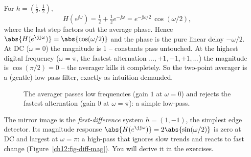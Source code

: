 \begin{example}
\label{ch12:freq-averager}
For $h=(\tfrac12,\tfrac12)$,
\[
  H(e^{\jj\omega}) = \tfrac12 + \tfrac12 e^{-\jj\omega}
  = e^{-\jj\omega/2}\,\cos(\omega/2),
\]
where the last step factors out the average phase. Hence
$\abs{H(e^{\jj\omega})}=\abs{\cos(\omega/2)}$ and the phase is the pure linear
delay $-\omega/2$. At DC ($\omega=0$) the magnitude is $1$ -- constants pass
untouched. At the highest digital frequency ($\omega=\pi$, the fastest
alternation $\dots,+1,-1,+1,\dots$) the magnitude is $\cos(\pi/2)=0$ -- the
averager kills it completely. So the two-point averager is a (gentle) low-pass
filter, exactly as intuition demanded.
\end{example}

\begin{figure}[H]
\centering
{}
\caption{The averager passes low frequencies (gain $1$ at $\omega=0$) and
rejects the fastest alternation (gain $0$ at $\omega=\pi$): a simple low-pass.}
\label{ch12:fig-averager-mag}
\end{figure}

The mirror image is the \emph{first-difference} system $h=(1,-1)$, the simplest
edge detector. Its magnitude response $\abs{H(e^{\jj\omega})}=2\abs{\sin(\omega/2)}$
is zero at DC and largest at $\omega=\pi$: a high-pass that ignores slow trends
and reacts to fast change (Figure~\ref{ch12:fig-diff-mag}). You will derive it in
the exercises.

